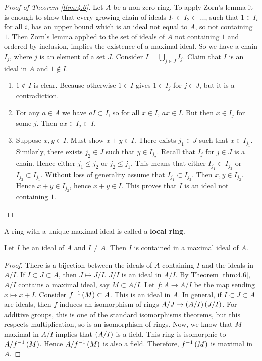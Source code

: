 \begin{proof}[Proof of Theorem \ref{thm:4.6}]
Let $ A $ be a non-zero ring. To apply Zorn's lemma it is enough to show that every growing chain of ideals $ I_1 \subset I_2 \subset \dots $, such that $ 1 \in I_i $ for all $ i $, has an upper bound which is an ideal not equal to $ A $, so not containing $ 1 $. Then Zorn's lemma applied to the set of ideals of $ A $ not containing $ 1 $ and ordered by inclusion, implies the existence of a maximal ideal. So we have a chain $ I_j $, where $ j $ is an element of a set $ J $. Consider $ I = \bigcup_{j \in J} I_j $. Claim that $ I $ is an ideal in $ A $ and $ 1 \notin I $.
\begin{enumerate}
\item $ 1 \notin I $ is clear. Because otherwise $ 1 \in I $ gives $ 1 \in I_j $ for $ j \in J $, but it is a contradiction.
\item For any $ a \in A $ we have $ aI \subset I $, so for all $ x \in I $, $ ax \in I $. But then $ x \in I_j $ for some $ j $. Then $ ax \in I_j \subset I $.
\item Suppose $ x, y \in I $. Must show $ x + y \in I $. There exists $ j_1 \in J $ such that $ x \in I_{j_1} $. Similarly, there exists $ j_2 \in J $ such that $ y \in I_{j_2} $. Recall that $ I_j $ for $ j \in J $ is a chain. Hence either $ j_1 \le j_2 $ or $ j_2 \le j_1 $. This means that either $ I_{j_1} \subset I_{j_2} $ or $ I_{j_2} \subset I_{j_1} $. Without loss of generality assume that $ I_{j_1} \subset I_{j_2} $. Then $ x, y \in I_{j_2} $. Hence $ x + y \in I_{j_2} $, hence $ x + y \in I $. This proves that $ I $ is an ideal not containing $ 1 $.
\end{enumerate}
\end{proof}

\begin{definition}
A ring with a unique maximal ideal is called a \textbf{local ring}.
\end{definition}

\begin{corollary}
\label{cor:4.9}
Let $ I $ be an ideal of $ A $ and $ I \ne A $. Then $ I $ is contained in a maximal ideal of $ A $.
\end{corollary}

\begin{proof}
There is a bijection between the ideals of $ A $ containing $ I $ and the ideals in $ A / I $. If $ I \subset J \subset A $, then $ J \mapsto J / I $. $ J / I $ is an ideal in $ A / I $. By Theorem \ref{thm:4.6}, $ A / I $ contains a maximal ideal, say $ M \subset A / I $. Let $ f : A \to A / I $ be the map sending $ x \mapsto x + I $. Consider $ f^{-1}\left( M \right) \subset A $. This is an ideal in $ A $. In general, if $ I \subset J \subset A $ are ideals, then $ f $ induces an isomorphism of rings $ A / J \to \left( A / I \right)\left( J / I \right) $. For additive groups, this is one of the standard isomorphisms theorems, but this respects multiplication, so is an isomorphism of rings. Now, we know that $ M $ maximal in $ A / I $ implies that $ \left( A / I \right) $ is a field. This ring is isomorphic to $ A / f^{-1}\left( M \right) $. Hence $ A / f^{-1}\left( M \right) $ is also a field. Therefore, $ f^{-1}\left( M \right) $ is maximal in $ A $.
\end{proof}

